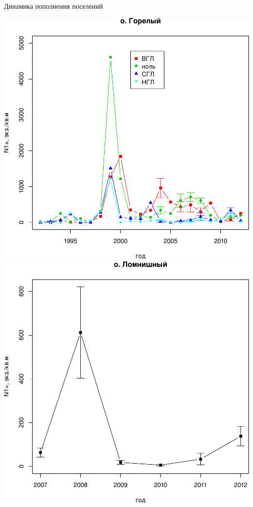 \documentclass{beamer}
\begin{document}
\begin{frame}{Динамика пополнения поселений}
\begin{minipage}[t]{.45\linewidth}
\begin{center}
\end{center}
	\end{minipage}
	\begin{minipage}[t]{.45\linewidth}
			\includegraphics[height=.45\textheight]{Goreliy_N_oneyear.pdf}\\
			\includegraphics[height=.45\textheight]{Lomnishniy_N_oneyear.pdf}
	\end{minipage}
\end{frame}
\end{document}
